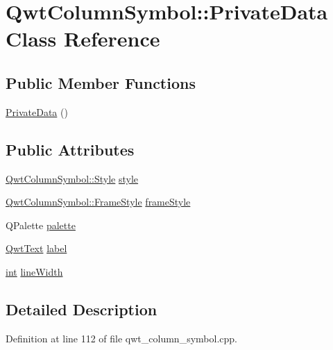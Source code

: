 \hypertarget{class_qwt_column_symbol_1_1_private_data}{\section{Qwt\-Column\-Symbol\-:\-:Private\-Data Class Reference}
\label{class_qwt_column_symbol_1_1_private_data}
}
\subsection*{Public Member Functions}
\begin{DoxyCompactItemize}
\item 
\hyperlink{class_qwt_column_symbol_1_1_private_data_a34e0ca3d72e76178720735bc3a6db48e}{Private\-Data} ()
\end{DoxyCompactItemize}
\subsection*{Public Attributes}
\begin{DoxyCompactItemize}
\item 
\hyperlink{class_qwt_column_symbol_aaace508375eef3ee23ed6c47b1d65ef2}{Qwt\-Column\-Symbol\-::\-Style} \hyperlink{class_qwt_column_symbol_1_1_private_data_aa63e78f0321a9d2754b9ef4a6517cd41}{style}
\item 
\hyperlink{class_qwt_column_symbol_a4b97f7748370447559a11a5adeb70e44}{Qwt\-Column\-Symbol\-::\-Frame\-Style} \hyperlink{class_qwt_column_symbol_1_1_private_data_a8cd9e10f417c013fa5980d1619506d5e}{frame\-Style}
\item 
Q\-Palette \hyperlink{class_qwt_column_symbol_1_1_private_data_a2a520b3a8dd9e781afaea646f5238285}{palette}
\item 
\hyperlink{class_qwt_text}{Qwt\-Text} \hyperlink{class_qwt_column_symbol_1_1_private_data_a392eceb4e4d4ac99e371c63c654728ae}{label}
\item 
\hyperlink{ioapi_8h_a787fa3cf048117ba7123753c1e74fcd6}{int} \hyperlink{class_qwt_column_symbol_1_1_private_data_a33133406701e80db6c346d35b8b6ee43}{line\-Width}
\end{DoxyCompactItemize}


\subsection{Detailed Description}


Definition at line 112 of file qwt\-\_\-column\-\_\-symbol.\-cpp.



